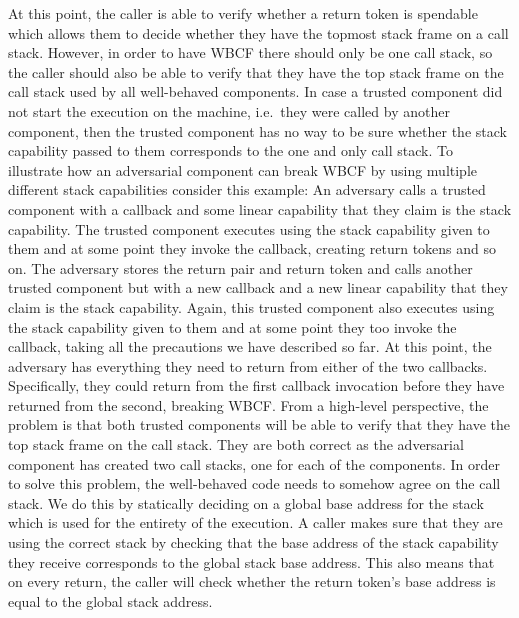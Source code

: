 \documentclass[acmsmall,review,anonymous]{acmart}\settopmatter{printfolios=true,printccs=false,printacmref=false}
\begin{document}
At this point, the caller is able to verify whether a return token is spendable which allows them to decide whether they have the topmost stack frame on a call stack.
However, in order to have WBCF there should only be one call stack, so the caller should also be able to verify that they have the top stack frame on the call stack used by all well-behaved components.
In case a trusted component did not start the execution on the machine, i.e.\ they were called by another component, then the trusted component has no way to be sure whether the stack capability passed to them corresponds to the one and only call stack.
To illustrate how an adversarial component can break WBCF by using multiple different stack capabilities consider this example: An adversary calls a trusted component with a callback and some linear capability that they claim is the stack capability.
The trusted component executes using the stack capability given to them and at some point they invoke the callback, creating return tokens and so on.
The adversary stores the return pair and return token and calls another trusted component but with a new callback and a new linear capability that they claim is the stack capability.
Again, this trusted component also executes using the stack capability given to them and at some point they too invoke the callback, taking all the precautions we have described so far.
At this point, the adversary has everything they need to return from either of the two callbacks.
Specifically, they could return from the first callback invocation before they have returned from the second, breaking WBCF.
From a high-level perspective, the problem is that both trusted components will be able to verify that they have the top stack frame on the call stack.
They are both correct as the adversarial component has created two call stacks, one for each of the components.
In order to solve this problem, the well-behaved code needs to somehow agree on the call stack.
We do this by statically deciding on a global base address for the stack which is used for the entirety of the execution.
A caller makes sure that they are using the correct stack by checking that the base address of the stack capability they receive corresponds to the global stack base address.
This also means that on every return, the caller will check whether the return token's base address is equal to the global stack address.
\end{document}
